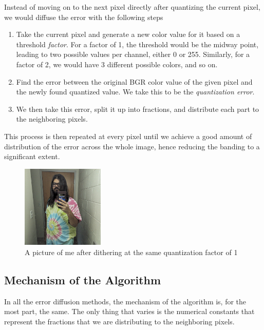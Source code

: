 \documentclass{article}
\begin{document}
\noindent Instead of moving on to the next pixel directly after quantizing the current pixel, we would diffuse the error with the following steps\cite{guilloteau:hal}

\begin{enumerate}
    \item Take the current pixel and generate a new color value for it based on a threshold \textit{factor}. For a factor of 1, the threshold would be the midway point, leading to two possible values per channel, either 0 or 255. Similarly, for a factor of 2, we would have 3 different possible colors, and so on.

    \item Find the error between the original BGR color value of the given pixel and the newly found quantized value. We take this to be the \textit{quantization error}.

    \item We then take this error, split it up into fractions, and distribute each part to the neighboring pixels.
\end{enumerate}

\noindent This process is then repeated at every pixel until we achieve a good amount of distribution of the error across the whole image, hence reducing the banding to a significant extent.

\begin{figure}[H]
    \centering
    \includegraphics[width=0.35\textwidth]{images/dithered_me.jpg}
    \caption{A picture of me after dithering at the same quantization factor of 1}
    \label{fig:me_dithered}
\end{figure}

\subsection{Mechanism of the Algorithm}\label{Floyd-Steinberg Mechanism}

\noindent In all the error diffusion methods, the mechanism of the algorithm is, for the most part, the same. The only thing that varies is the numerical constants that represent the fractions that we are distributing to the neighboring pixels\cite{guilloteau:hal}.
\end{document}
